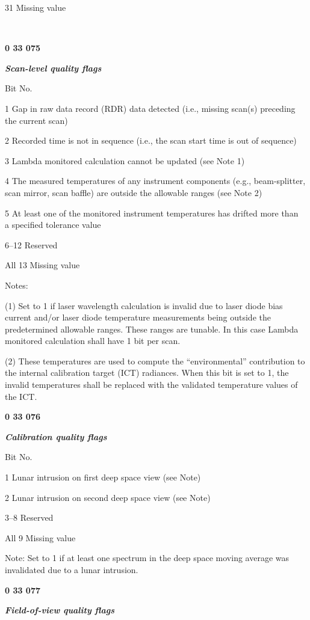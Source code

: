 31 Missing value

\textbf{\\
}

\textbf{0 33 075}

\emph{\textbf{Scan-level quality flags}}

Bit No.

1 Gap in raw data record (RDR) data detected (i.e., missing scan(s) preceding the current scan)

2 Recorded time is not in sequence (i.e., the scan start time is out of sequence)

3 Lambda monitored calculation cannot be updated (see Note 1)

4 The measured temperatures of any instrument components (e.g., beam-splitter, scan mirror, scan baffle) are outside the allowable ranges (see Note 2)

5 At least one of the monitored instrument temperatures has drifted more than\\
a specified tolerance value

6--12 Reserved

All 13 Missing value

Notes:

(1) Set to 1 if laser wavelength calculation is invalid due to laser diode bias current and/or laser diode temperature measurements being outside the predetermined allowable ranges. These ranges are tunable. In this case Lambda monitored calculation shall have 1 bit per scan.

(2) These temperatures are used to compute the ``environmental'' contribution to the internal calibration target (ICT) radiances. When this bit is set to 1, the invalid temperatures shall be replaced with the validated temperature values of the ICT.

\textbf{0 33 076}

\emph{\textbf{Calibration quality flags}}

Bit No.

1 Lunar intrusion on first deep space view (see Note)

2 Lunar intrusion on second deep space view (see Note)

3--8 Reserved

All 9 Missing value

Note: Set to 1 if at least one spectrum in the deep space moving average was invalidated due to a lunar intrusion.

\textbf{0 33 077}

\emph{\textbf{Field-of-view quality flags}}

